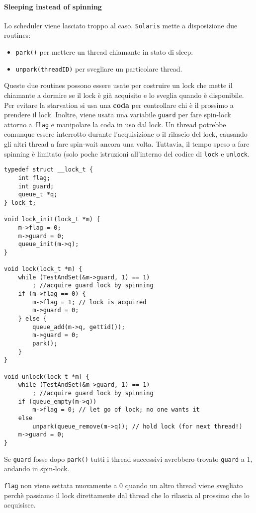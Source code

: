 \documentclass[12pt, letterpaper]{article}
\begin{document}
				\paragraph{Sleeping instead of spinning} Lo scheduler viene lasciato troppo al caso. \texttt{Solaris} mette a disposizione due routines:
				\begin{itemize}
					\item \texttt{park()} per mettere un thread chiamante in stato di sleep.
					\item \texttt{unpark(threadID)} per svegliare un particolare thread.
				\end{itemize}
				Queste due routines possono essere usate per costruire un lock che mette il chiamante a dormire se il lock è già acquisito e lo sveglia quando è disponibile. Per evitare la starvation si usa una \textbf{coda} per controllare chi è il prossimo a prendere il lock. Inoltre, viene usata una variabile \texttt{guard} per fare spin-lock attorno a \texttt{flag} e manipolare la coda in uso dal lock. Un thread potrebbe comunque essere interrotto durante l'acquisizione o il rilascio del lock, causando gli altri thread a fare spin-wait ancora una volta. Tuttavia, il tempo speso a fare spinning è limitato (solo poche istruzioni all'interno del codice di \texttt{lock} e \texttt{unlock}.
				
				\begin{lstlisting}[style=CStyle]
typedef struct __lock_t {
	int flag;
	int guard;
	queue_t *q;
} lock_t;

void lock_init(lock_t *m) {
	m->flag = 0;
	m->guard = 0;
	queue_init(m->q);
}

void lock(lock_t *m) {
	while (TestAndSet(&m->guard, 1) == 1)
		; //acquire guard lock by spinning
	if (m->flag == 0) {
		m->flag = 1; // lock is acquired
		m->guard = 0;
	} else {
		queue_add(m->q, gettid());
		m->guard = 0;
		park();
	}
}

void unlock(lock_t *m) {
	while (TestAndSet(&m->guard, 1) == 1)
		; //acquire guard lock by spinning
	if (queue_empty(m->q))
		m->flag = 0; // let go of lock; no one wants it
	else
		unpark(queue_remove(m->q)); // hold lock (for next thread!)
	m->guard = 0;
}				\end{lstlisting}				
				
				Se \texttt{guard} fosse dopo \texttt{park()} tutti i thread successivi avrebbero trovato \texttt{guard} a 1, andando in spin-lock.
				
				\texttt{flag} non viene settata nuovamente a 0 quando un altro thread viene svegliato perchè passiamo il lock direttamente dal thread che lo rilascia al prossimo che lo acquisisce. 
				
\end{document}
